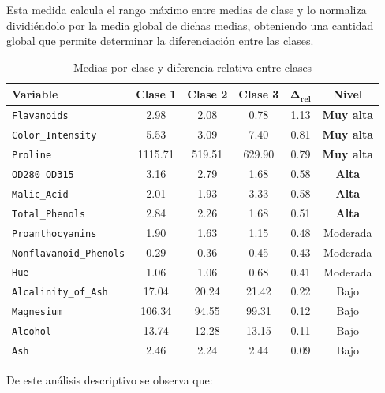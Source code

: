 Esta medida calcula el rango máximo entre medias de clase y lo normaliza
dividiéndolo por la media global de dichas medias, obteniendo una cantidad global que permite determinar la diferenciación entre las clases.
\begin{table}[H]
\centering
\caption{Medias por clase y diferencia relativa entre clases}
\begin{tabular}{lccccc}
\toprule
\textbf{Variable} & \textbf{Clase 1} & \textbf{Clase 2} & \textbf{Clase 3} & $\boldsymbol{\Delta_{rel}}$ & \textbf{Nivel} \\
\midrule
\texttt{Flavanoids}              & 2.98   & 2.08   & 0.78   & 1.13 & \textbf{Muy alta} \\
\texttt{Color\_Intensity}        & 5.53   & 3.09   & 7.40   & 0.81 & \textbf{Muy alta} \\
\texttt{Proline}                 & 1115.71& 519.51 & 629.90 & 0.79 & \textbf{Muy alta} \\
\texttt{OD280\_OD315}            & 3.16   & 2.79   & 1.68   & 0.58 & \textbf{Alta} \\
\texttt{Malic\_Acid}             & 2.01   & 1.93   & 3.33   & 0.58 & \textbf{Alta} \\
\texttt{Total\_Phenols}          & 2.84   & 2.26   & 1.68   & 0.51 & \textbf{Alta} \\
\texttt{Proanthocyanins}         & 1.90   & 1.63   & 1.15   & 0.48 & Moderada \\
\texttt{Nonflavanoid\_Phenols}   & 0.29   & 0.36   & 0.45   & 0.43 & Moderada \\
\texttt{Hue}                     & 1.06   & 1.06   & 0.68   & 0.41 & Moderada \\
\texttt{Alcalinity\_of\_Ash}     & 17.04  & 20.24  & 21.42  & 0.22 & Bajo \\
\texttt{Magnesium}               & 106.34 & 94.55  & 99.31  & 0.12 & Bajo \\
\texttt{Alcohol}                 & 13.74  & 12.28  & 13.15  & 0.11 & Bajo \\
\texttt{Ash}                     & 2.46   & 2.24   & 2.44   & 0.09 & Bajo \\
\bottomrule
\end{tabular}
\label{tab:medias_clase_diff}
\end{table}

De este análisis descriptivo se observa que:

